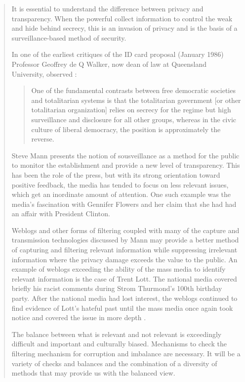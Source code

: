 \begin{quote}
It is essential to understand the difference between privacy and transparency. When the powerful collect information to control the weak and hide behind secrecy, this is an invasion of privacy and is the basis of a surveillance-based method of security.

In one of the earliest critiques of the ID card proposal (January 1986) Professor Geoffrey de Q Walker, now dean of law at Queensland University, observed \cite{davies_privacy_nodate}:

\begin{quotation}One of the fundamental contrasts between free democratic societies and totalitarian systems is that the totalitarian government [or other totalitarian organization] relies on secrecy for the regime but high surveillance and disclosure for all other groups, whereas in the civic culture of liberal democracy, the position is approximately the reverse.\end{quotation}

Steve Mann presents the notion of sousveillance \cite{mann2002sousveillance} as a method for the public to monitor the establishment and provide a new level of transparency. This has been the role of the press, but with its strong orientation toward positive feedback, the media has tended to focus on less relevant issues, which get an inordinate amount of attention. One such example was the media's fascination with Gennifer Flowers and her claim that she had had an affair with President Clinton.

Weblogs and other forms of filtering coupled with many of the capture and transmission technologies discussed by Mann may provide a better method of capturing and filtering relevant information while suppressing irrelevant information where the privacy damage exceeds the value to the public.
An example of weblogs exceeding the ability of the mass media to identify relevant information is the case of Trent Lott. The national media covered briefly his racist comments during Strom Thurmond's 100th birthday party. After the national media had lost interest, the weblogs continued to find evidence of Lott's hateful past until the mass media once again took notice and covered the issue in more depth \cite{shachtman2002blogs}.

The balance between what is relevant and not relevant is exceedingly difficult and important and culturally biased. Mechanisms to check the filtering mechanism for corruption and imbalance are necessary. It will be a variety of checks and balances and the combination of a diversity of methods that may provide us with the balanced view.


\end{quote}
